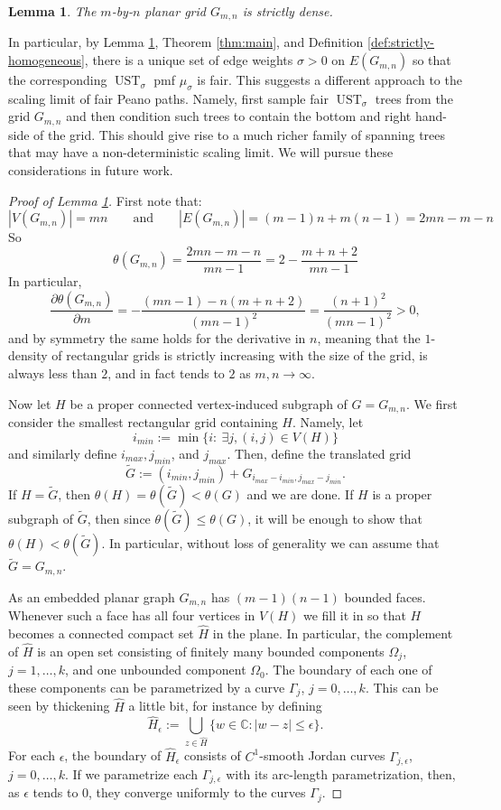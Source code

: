 \documentclass[preprint,12pt]{elsarticle}
\newtheorem{lemma}[theorem]{Lemma}
\theoremstyle{definition}
\theoremstyle{remark}
\numberwithin{equation}{section}
\newcommand{\C}{\mathbb{C}}
\newcommand{\ep}{\epsilon }
\newcommand{\si}{\sigma }
\newcommand{\Ga}{\Gamma }
\newcommand{\Om}{\Omega }
\newcommand{\UST}{\operatorname{UST}}
\begin{document}
\begin{lemma}\label{lem:planar-grids}
 The $m$-by-$n$ planar grid $G_{m,n}$ is strictly dense.
\end{lemma}
In particular, by Lemma \ref{lem:planar-grids}, Theorem \ref{thm:main}, and Definition \ref{def:strictly-homogeneous}, 
there is a unique set of edge weights $\si>0$ on $E(G_{m,n})$ so that the corresponding $\UST_\si$ pmf $\mu_\si$ is fair. This suggests a different approach to the scaling limit of fair Peano paths. Namely, first sample fair $\UST_\si$ trees from the grid $G_{m,n}$ and then condition such trees to  contain the bottom and right hand-side of the grid. This should give rise to a much richer family of spanning trees that may have a non-deterministic scaling limit. We will pursue these considerations in future work.
\begin{proof}[Proof of Lemma \ref{lem:planar-grids}]
First note that:
\[
|V(G_{m,n})|=mn\qquad\text{and}\qquad |E(G_{m,n})|=(m-1)n+m(n-1)=2mn-m-n
\]
So
\[
\theta(G_{m,n})=\frac{2mn-m-n}{mn-1}=2-\frac{m+n+2}{mn-1}
\]
In particular,
\[
\frac{\partial \theta(G_{m,n})}{\partial m}=-\frac{(mn-1)-n(m+n+2)}{(mn-1)^2}=\frac{(n+1)^2}{(mn-1)^2}>0,
\]
and by symmetry the same holds for the derivative in $n$, meaning that the $1$-density of rectangular grids is strictly increasing with the size of the grid, is always less than $2$, and in fact tends to $2$ as $m,n\rightarrow\infty$.

Now let $H$ be a proper connected vertex-induced subgraph of $G=G_{m,n}$. We first consider the smallest rectangular grid containing $H$. Namely, let
\[
i_{min}:=\min\{i:\ \exists j, (i,j)\in V(H)\}
\]
and similarly define $i_{max}, j_{min}$, and $j_{max}$. Then, define the translated grid
\[
\tilde{G}:=(i_{min},j_{min})+G_{i_{max}-i_{min},j_{max}-j_{min}}.
\]
If $H=\tilde{G}$, then $\theta(H)=\theta(\tilde{G})< \theta(G)$ and we are done. If $H$ is a proper subgraph of $\tilde{G}$, then since $\theta(\tilde{G})\le \theta(G)$, it will be enough to show that $\theta(H)<\theta(\tilde{G})$. In particular, without loss of generality we can assume that $\tilde{G}=G_{m,n}$.


As an embedded planar graph $G_{m,n}$ has $(m-1)(n-1)$ bounded faces. Whenever such a face has all four vertices in $V(H)$ we fill it in so that $H$ becomes a connected compact set $\hat{H}$ in the plane. In particular, the complement of $\hat{H}$ is an open set consisting of finitely many bounded components $\Om_j$, $j=1,\dots,k$, and one unbounded component $\Om_0$. The boundary of each one of these components can be parametrized by a curve $\Ga_j$, $j=0,\dots,k$. This can be seen by thickening $\hat{H}$ a little bit, for instance by defining
\[
\hat{H}_\ep:=\bigcup_{z\in\hat{H}}\{w\in\C: |w-z|\le \ep\}.
\]
For each $\ep$, the boundary of $\hat{H}_\ep$ consists of $C^1$-smooth Jordan curves $\Ga_{j,\ep}$, $j=0,\dots,k$. If we parametrize each $\Ga_{j,\ep}$ with its arc-length parametrization, then, as $\ep$ tends to $0$, they converge uniformly to the curves $\Ga_j$.
 

\end{proof}
\end{document}
